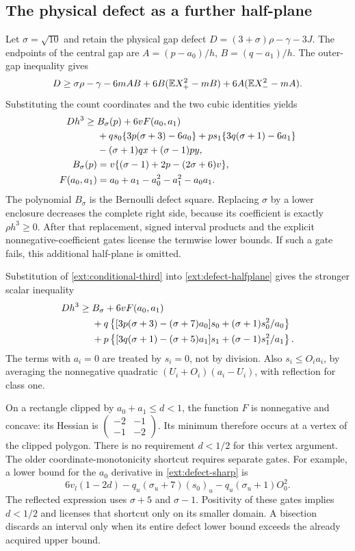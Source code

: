 \subsection{The physical defect as a further half-plane}
Let $\sigma=\sqrt{10}$ and retain the physical gap defect
$D=(3+\sigma)\rho-\gamma-3J$.
The endpoints of the central gap are
$A=(p-a_0)/h$, $B=(q-a_1)/h$.
The outer-gap inequality gives
\[
 D\ge\sigma\rho-\gamma-6mAB
       +6B(\mathbb E X_+^2-mB)+6A(\mathbb E X_-^2-mA).
\]
Substituting the count coordinates and the two cubic identities yields
\begin{align}
 Dh^3\ge{}&B_\sigma(p)+6vF(a_0,a_1)\notag\\
 &+qs_0\{3p(\sigma+3)-6a_0\}
  +ps_1\{3q(\sigma+1)-6a_1\}\notag\\
 &-(\sigma+1)qx+(\sigma-1)py,\label{ext:defect-halfplane}\\
 B_\sigma(p)&=v\{(\sigma-1)+2p-(2\sigma+6)v\},\notag\\
 F(a_0,a_1)&=a_0+a_1-a_0^2-a_1^2-a_0a_1.\notag
\end{align}
The polynomial $B_\sigma$ is the Bernoulli defect square.
Replacing $\sigma$ by a lower enclosure decreases the complete right
side, because its coefficient is exactly $\rho h^3\ge0$.
After that replacement, signed interval products and the explicit
nonnegative-coefficient gates license the termwise lower bounds.
If such a gate fails, this additional half-plane is omitted.

Substitution of \eqref{ext:conditional-third} into
\eqref{ext:defect-halfplane} gives the stronger scalar inequality
\begin{align}
 Dh^3\ge{}&B_\sigma+6vF(a_0,a_1)\notag\\
 &+q\left\{[3p(\sigma+3)-(\sigma+7)a_0]s_0
                         +(\sigma+1)s_0^2/a_0\right\}\notag\\
 &+p\left\{[3q(\sigma+1)-(\sigma+5)a_1]s_1
                         +(\sigma-1)s_1^2/a_1\right\}.
 \label{ext:defect-sharp}
\end{align}
The terms with $a_i=0$ are treated by $s_i=0$, not by division.
Also $s_i\le O_i a_i$, by averaging the nonnegative quadratic
$(U_i+O_i)(a_i-U_i)$, with reflection for class one.

On a rectangle clipped by $a_0+a_1\le d<1$, the function $F$ is
nonnegative and concave: its Hessian is
$\left(\begin{smallmatrix}-2&-1\\-1&-2\end{smallmatrix}\right)$.
Its minimum therefore occurs at a vertex of the clipped polygon.
There is no requirement $d<1/2$ for this vertex argument.
The older coordinate-monotonicity shortcut requires separate gates.
For example, a lower bound for the $a_0$ derivative in
\eqref{ext:defect-sharp} is
\[
 6v_l(1-2d)-q_u(\sigma_u+7)(s_0)_u
                       -q_u(\sigma_u+1)O_0^2.
\]
The reflected expression uses $\sigma+5$ and $\sigma-1$.
Positivity of these gates implies $d<1/2$ and licenses that shortcut
only on its smaller domain. A bisection discards an interval only when
its entire defect lower bound exceeds the already acquired upper bound.

